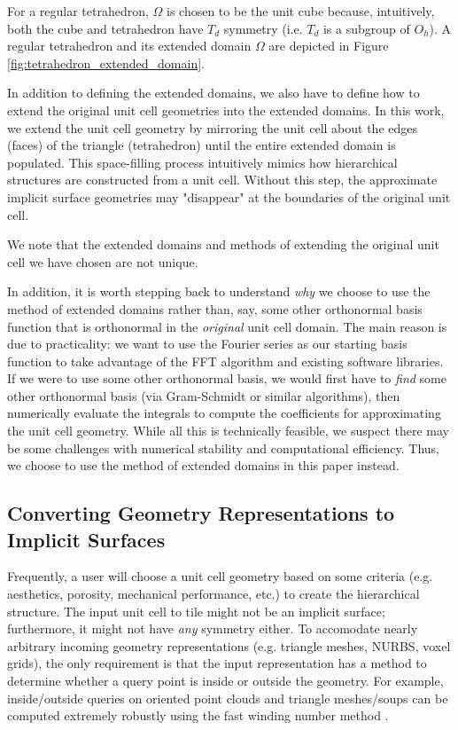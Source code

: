 \documentclass[acmtog]{acmart}
\begin{document}
For a regular tetrahedron, $\Omega$ is chosen to be the unit cube because, intuitively, both the cube and tetrahedron have $T_d$ symmetry (i.e. $T_d$ is a subgroup of $O_h$). A regular tetrahedron and its extended domain $\Omega$ are depicted in Figure \ref{fig:tetrahedron_extended_domain}.

In addition to defining the extended domains, we also have to define how to extend the original unit cell geometries into the extended domains. In this work, we extend the unit cell geometry by mirroring the unit cell about the edges (faces) of the triangle (tetrahedron) until the entire extended domain is populated. This space-filling process intuitively mimics how hierarchical structures are constructed from a unit cell. Without this step, the approximate implicit surface geometries may "disappear" at the boundaries of the original unit cell.

We note that the extended domains and methods of extending the original unit cell we have chosen are not unique.

In addition, it is worth stepping back to understand \textit{why} we choose to use the method of extended domains rather than, say, some other orthonormal basis function that is orthonormal in the \textit{original} unit cell domain. The main reason is due to practicality: we want to use the Fourier series as our starting basis function to take advantage of the FFT algorithm and existing software libraries. If we were to use some other orthonormal basis, we would first have to \textit{find} some other orthonormal basis (via Gram-Schmidt or similar algorithms), then numerically evaluate the integrals to compute the coefficients for approximating the unit cell geometry. While all this is technically feasible, we suspect there may be some challenges with numerical stability and computational efficiency. Thus, we choose to use the method of extended domains in this paper instead.

\subsection{Converting Geometry Representations to Implicit Surfaces}
\label{sec:converting_geometry}

Frequently, a user will choose a unit cell geometry based on some criteria (e.g. aesthetics, porosity, mechanical performance, etc.) to create the hierarchical structure. The input unit cell to tile might not be an implicit surface; furthermore, it might not have \textit{any} symmetry either. To accomodate nearly arbitrary incoming geometry representations (e.g. triangle meshes, NURBS, voxel grids), the only requirement is that the input representation has a method to determine whether a query point is inside or outside the geometry. For example, inside/outside queries on oriented point clouds and triangle meshes/soups can be computed extremely robustly using the fast winding number method \cite{barill2018fast}.
\end{document}
